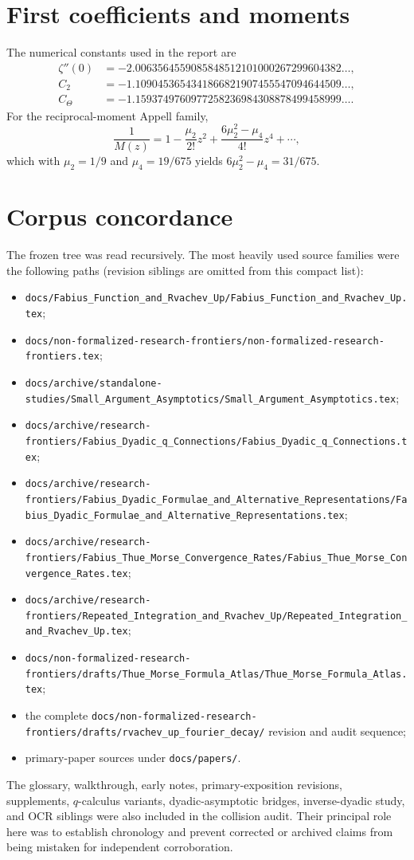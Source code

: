 \documentclass[11pt,oneside]{article}
\numberwithin{equation}{section}
\theoremstyle{definition}
\theoremstyle{remark}
\begin{document}
\section{First coefficients and moments}
\label{app:coefficients}

The numerical constants used in the report are
\begin{align*}
 \zeta''(0)&=-2.0063564559085848512101000267299604382\ldots,\\
 C_2&=-1.1090453654341866821907455547094644509\ldots,\\
 C_{\Theta}&=-1.1593749760977258236984308878499458999\ldots.
\end{align*}
For the reciprocal-moment Appell family,
\[
 \frac1{M(z)}=1-\frac{\mu_2}{2!}z^2
 +\frac{6\mu_2^2-\mu_4}{4!}z^4+\cdots,
\]
which with $\mu_2=1/9$ and $\mu_4=19/675$ yields
$6\mu_2^2-\mu_4=31/675$.

\section{Corpus concordance}
\label{app:corpus}

The frozen tree was read recursively.  The most heavily used source families
were the following paths (revision siblings are omitted from this compact list):
\begin{itemize}
\item \nolinkurl{docs/Fabius_Function_and_Rvachev_Up/Fabius_Function_and_Rvachev_Up.tex};
\item \nolinkurl{docs/non-formalized-research-frontiers/non-formalized-research-frontiers.tex};
\item \nolinkurl{docs/archive/standalone-studies/Small_Argument_Asymptotics/Small_Argument_Asymptotics.tex};
\item \nolinkurl{docs/archive/research-frontiers/Fabius_Dyadic_q_Connections/Fabius_Dyadic_q_Connections.tex};
\item \nolinkurl{docs/archive/research-frontiers/Fabius_Dyadic_Formulae_and_Alternative_Representations/Fabius_Dyadic_Formulae_and_Alternative_Representations.tex};
\item \nolinkurl{docs/archive/research-frontiers/Fabius_Thue_Morse_Convergence_Rates/Fabius_Thue_Morse_Convergence_Rates.tex};
\item \nolinkurl{docs/archive/research-frontiers/Repeated_Integration_and_Rvachev_Up/Repeated_Integration_and_Rvachev_Up.tex};
\item \nolinkurl{docs/non-formalized-research-frontiers/drafts/Thue_Morse_Formula_Atlas/Thue_Morse_Formula_Atlas.tex};
\item the complete \nolinkurl{docs/non-formalized-research-frontiers/drafts/rvachev_up_fourier_decay/} revision and audit sequence;
\item primary-paper sources under \nolinkurl{docs/papers/}.
\end{itemize}
The glossary, walkthrough, early notes, primary-exposition revisions, supplements,
$q$-calculus variants, dyadic-asymptotic bridges, inverse-dyadic study, and OCR
siblings were also included in the collision audit.  Their principal role here
was to establish chronology and prevent corrected or archived claims from being
mistaken for independent corroboration.
\end{document}
